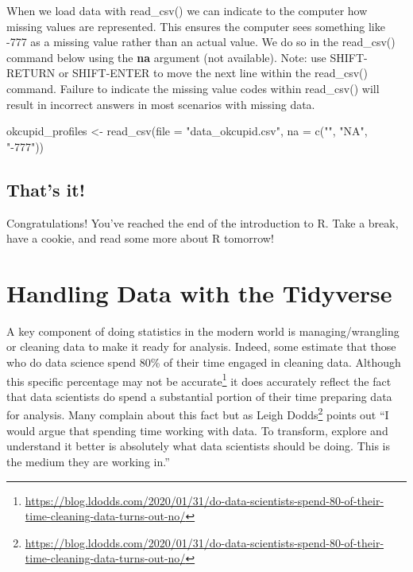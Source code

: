 \documentclass[
]{krantz}
\makeatletter
\newenvironment{Shaded}{\begin{snugshade}}{\end{snugshade}}
\newcommand{\AttributeTok}[1]{\textcolor[rgb]{0.61,0.61,0.61}{#1}}
\newcommand{\FunctionTok}[1]{\textcolor[rgb]{0,0,0}{#1}}
\newcommand{\NormalTok}[1]{#1}
\newcommand{\OtherTok}[1]{\textcolor[rgb]{0.37,0.37,0.37}{#1}}
\newcommand{\StringTok}[1]{\textcolor[rgb]{0.5,0.5,0.5}{#1}}
\renewcommand{\href}[2]{#2\footnote{\url{#1}}}
\newenvironment{kframe}{%
\medskip{}
\setlength{\fboxsep}{.8em}
 \def\at@end@of@kframe{}%
 \ifinner\ifhmode%
  \def\at@end@of@kframe{\end{minipage}}%
  \begin{minipage}{\columnwidth}%
 \fi\fi%
 \def\FrameCommand##1{\hskip\@totalleftmargin \hskip-\fboxsep
 \colorbox{shadecolor}{##1}\hskip-\fboxsep
     \hskip-\linewidth \hskip-\@totalleftmargin \hskip\columnwidth}%
 \MakeFramed {\advance\hsize-\width
   \@totalleftmargin\z@ \linewidth\hsize
   \@setminipage}}%
 {\par\unskip\endMakeFramed%
 \at@end@of@kframe}
\renewenvironment{Shaded}{\begin{kframe}}{\end{kframe}}
\makeatother
\begin{document}
When we load data with read\_csv() we can indicate to the computer how missing values are represented. This ensures the computer sees something like -777 as a missing value rather than an actual value. We do so in the read\_csv() command below using the \textbf{na} argument (not available). Note: use SHIFT-RETURN or SHIFT-ENTER to move the next line within the read\_csv() command. Failure to indicate the missing value codes within read\_csv() will result in incorrect answers in most scenarios with missing data.

\begin{Shaded}
\begin{Highlighting}[]
\NormalTok{okcupid\_profiles }\OtherTok{\textless{}{-}} \FunctionTok{read\_csv}\NormalTok{(}\AttributeTok{file =} \StringTok{"data\_okcupid.csv"}\NormalTok{,}
                             \AttributeTok{na =} \FunctionTok{c}\NormalTok{(}\StringTok{""}\NormalTok{, }\StringTok{"NA"}\NormalTok{, }\StringTok{"{-}777"}\NormalTok{))}
\end{Highlighting}
\end{Shaded}

\hypertarget{thats-it}{%
\section{That's it!}\label{thats-it}}

Congratulations! You've reached the end of the introduction to R. Take a break, have a cookie, and read some more about R tomorrow!

\hypertarget{handling-data-with-the-tidyverse}{%
\chapter{Handling Data with the Tidyverse}\label{handling-data-with-the-tidyverse}}

A key component of doing statistics in the modern world is managing/wrangling or cleaning data to make it ready for analysis. Indeed, some estimate that those who do data science spend 80\% of their time engaged in cleaning data. Although this specific percentage \href{https://blog.ldodds.com/2020/01/31/do-data-scientists-spend-80-of-their-time-cleaning-data-turns-out-no/}{may not be accurate} it does accurately reflect the fact that data scientists do spend a substantial portion of their time preparing data for analysis. Many complain about this fact but as \href{https://blog.ldodds.com/2020/01/31/do-data-scientists-spend-80-of-their-time-cleaning-data-turns-out-no/}{Leigh Dodds} points out ``I would argue that spending time working with data. To transform, explore and understand it better is absolutely what data scientists should be doing. This is the medium they are working in.''
\end{document}
